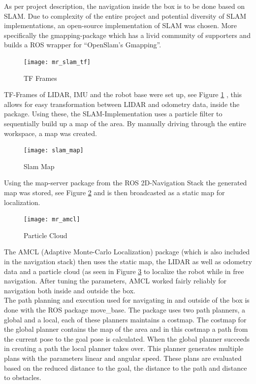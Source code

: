     As per project description, the navigation inside the box is to be done based on SLAM. 
    Due to complexity of the entire project and potential diversity of SLAM implementations, an open-source implementation of SLAM was chosen. 
    More specifically the gmapping-package \cite{gmapping} which has a livid community of supporters and builds a ROS wrapper for “OpenSlam's Gmapping”\cite{openslam}. 
	\begin{figure}[H]
        \centering
        \texttt{[image: mr\_slam\_tf]}
        \caption{TF Frames}
        \label{fig:tf_frames}
    \end{figure}
    TF-Frames of LIDAR, IMU and the robot base were set up, see Figure \ref{fig:tf_frames} , this allows for easy transformation between LIDAR and odometry data, inside the package. 
    Using these, the SLAM-Implementation uses a particle filter to sequentially build up a map of the area. 
    By manually driving through the entire workspace, a map was created. 
    \begin{figure}[H]
        \centering
        \texttt{[image: slam\_map]}
        \caption{Slam Map}
        \label{fig:slam_map}
    \end{figure}
    Using the map-server package from the ROS 2D-Navigation Stack \cite{navigation_stack} the generated map was stored, see Figure \ref{fig:slam_map} and is then broadcasted as a static map for localization.
   \begin{figure}[H]
        \centering
        \texttt{[image: mr\_amcl]}
        \caption{Particle Cloud}
        \label{fig:particle_cloud}
    \end{figure}
    The AMCL (Adaptive Monte-Carlo Localization) package (which is also included in the navigation stack) then uses the static map, the LIDAR as well as odometry data and a particle cloud (as seen in Figure \ref{fig:particle_cloud} to localize the robot while in free navigation. 
    After tuning the parameters, AMCL worked fairly reliably for navigation both inside and outside the box.\\
	The path planning and execution used for navigating in and outside of the box is done with the ROS package move{\_}base. The package uses two path planners, a global and a local, each of these planners maintains a costmap. The costmap for the global planner contains the map of the area and in this costmap a path from the current pose to the goal pose is calculated. When the global planner succeeds in creating a path the local planner takes over. This planner generates multiple plans with the parameters linear and angular speed. These plans are evaluated based on the reduced distance to the goal, the distance to the path and distance to obstacles. \\
